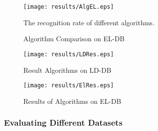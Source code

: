 \begin{figure}
	\centering		
	 \texttt{[image: results/AlgEL.eps]}
	 	\caption{Algorithm Comparison on EL-DB} The recognition rate of different algorithms. 
	 	\label{fig:testEL}
\end{figure} 

 
\begin{figure}
	\centering
		\texttt{[image: results/LDRes.eps]}
	\caption{Result Algorithms on LD-DB}
	\label{fig:LDRes}
\end{figure}
\begin{figure}
	\centering
		\texttt{[image: results/ElRes.eps]}
	\caption{Results of Algorithms on EL-DB}
	\label{fig:ElRes}
\end{figure}


\subsubsection {Evaluating Different Datasets}
 \label{sec:EffectsofSymbolComplixity}
 
